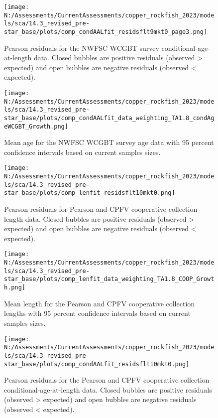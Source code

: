 \documentclass[11pt,
  english,
  letterpaper,
]{article}
\begin{document}
\pagebreak

\begin{figure}
\centering
\texttt{[image: N:/Assessments/CurrentAssessments/copper\_rockfish\_2023/models/sca/14.3\_revised\_pre-star\_base/plots/comp\_condAALfit\_residsflt9mkt0\_page3.png]}
\caption{Pearson residuals for the NWFSC WCGBT survey conditional-age-at-length data. Closed bubbles are positive residuals (observed \textgreater{} expected) and open bubbles are negative residuals (observed \textless{} expected).\label{fig:wcgbt-age-pearson-3}}
\end{figure}

\pagebreak

\begin{figure}
\centering
\texttt{[image: N:/Assessments/CurrentAssessments/copper\_rockfish\_2023/models/sca/14.3\_revised\_pre-star\_base/plots/comp\_condAALfit\_data\_weighting\_TA1.8\_condAgeWCGBT\_Growth.png]}
\caption{Mean age for the NWFSC WCGBT survey age data with 95 percent confidence intervals based on current samples sizes.\label{fig:wcgbt-mean-age-fit}}
\end{figure}

\pagebreak

\begin{figure}
\centering
\texttt{[image: N:/Assessments/CurrentAssessments/copper\_rockfish\_2023/models/sca/14.3\_revised\_pre-star\_base/plots/comp\_lenfit\_residsflt10mkt0.png]}
\caption{Pearson residuals for Pearson and CPFV cooperative collection length data. Closed bubbles are positive residuals (observed \textgreater{} expected) and open bubbles are negative residuals (observed \textless{} expected).\label{fig:coop-len-pearson}}
\end{figure}

\pagebreak

\begin{figure}
\centering
\texttt{[image: N:/Assessments/CurrentAssessments/copper\_rockfish\_2023/models/sca/14.3\_revised\_pre-star\_base/plots/comp\_lenfit\_data\_weighting\_TA1.8\_COOP\_Growth.png]}
\caption{Mean length for the Pearson and CPFV cooperative collection lengths with 95 percent confidence intervals based on current samples sizes.\label{fig:coop-mean-len-fit}}
\end{figure}

\pagebreak

\begin{figure}
\centering
\texttt{[image: N:/Assessments/CurrentAssessments/copper\_rockfish\_2023/models/sca/14.3\_revised\_pre-star\_base/plots/comp\_condAALfit\_residsflt10mkt0.png]}
\caption{Pearson residuals for the Pearson and CPFV cooperative collection conditional-age-at-length data. Closed bubbles are positive residuals (observed \textgreater{} expected) and open bubbles are negative residuals (observed \textless{} expected).\label{fig:coop-age-pearson}}
\end{figure}
\end{document}

